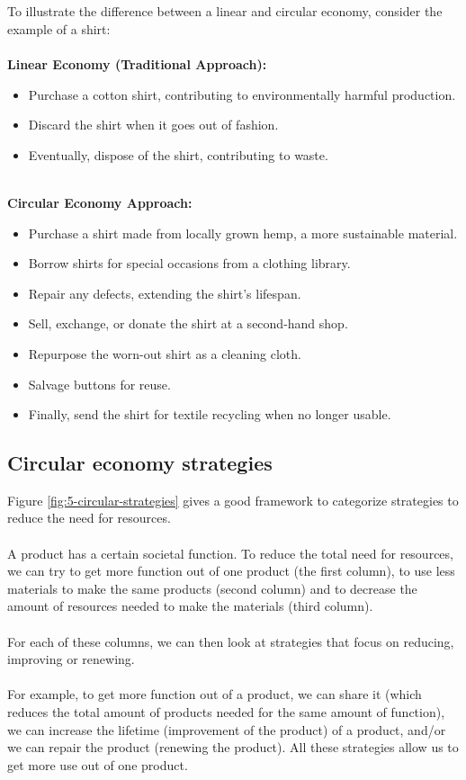 \documentclass[../summary.tex]{subfiles}
\begin{document}
	\\\\
	To illustrate the difference between a linear and circular economy, consider the example of a shirt:\\
	\\
	\textbf{Linear Economy (Traditional Approach):}
	\begin{itemize}
		\itemsep0em 
		\item Purchase a cotton shirt, contributing to environmentally harmful production.
		\item Discard the shirt when it goes out of fashion.
		\item Eventually, dispose of the shirt, contributing to waste.
	\end{itemize}
	\ \\
	\textbf{Circular Economy Approach:}
	\begin{itemize}
		\itemsep0em 
		\item Purchase a shirt made from locally grown hemp, a more sustainable material.
		\item Borrow shirts for special occasions from a clothing library.
		\item Repair any defects, extending the shirt's lifespan.
		\item Sell, exchange, or donate the shirt at a second-hand shop.
		\item Repurpose the worn-out shirt as a cleaning cloth.
		\item Salvage buttons for reuse.
		\item Finally, send the shirt for textile recycling when no longer usable.
	\end{itemize}
	\newpage
	\subsection{Circular economy strategies}
	
	Figure \ref{fig:5-circular-strategies} gives a good framework to categorize strategies to reduce the need for resources.\\
	\\
	A product has a certain societal function. To reduce the total need for resources, we can try to get more function out of one product (the first column), to use less materials to make the same products (second column) and to decrease the amount of resources needed to make the materials (third column). \\
	\\
	For each of these columns, we can then look at strategies that focus on reducing, improving or renewing. \\
	\\
	For example, to get more function out of a product, we can share it (which reduces the total amount of products needed for the same amount of function), we can increase the lifetime (improvement of the product) of a product, and/or we can repair the product (renewing the product). All these strategies allow us to get more use out of one product. 
	
\end{document}
